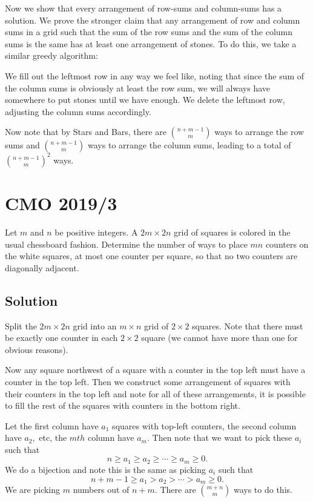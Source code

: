 \documentclass{article}
\begin{document}
Now we show that every arrangement of row-sums and column-sums has a solution. We prove the stronger claim that any arrangement of row and column sums in a grid such that the sum of the row sums and the sum of the column sums is the same has at least one arrangement of stones. To do this, we take a similar greedy algorithm:

\begin{itemize}
\Item We fill out the leftmost row in any way we feel like, noting that since the sum of the column sums is obviously at least the row sum, we will always have somewhere to put stones until we have enough.
\Item We delete the leftmost row, adjusting the column sums accordingly.
\end{itemize}

Now note that by Stars and Bars, there are $\binom{n+m-1}{m}$ ways to arrange the row sums and $\binom{n+m-1}{m}$ ways to arrange the column sums, leading to a total of $\binom{n+m-1}{m}^2$ ways.

\pagebreak\section{CMO 2019/3}

Let $m$ and $n$ be positive integers. A $2m\times 2n$ grid of squares is colored in the usual chessboard fashion. Determine the number of ways to place $mn$ counters on the white squares, at most one counter per square, so that no two counters are diagonally adjacent.

\subsection{Solution}

Split the $2m\times 2n$ grid into an $m\times n$ grid of $2\times 2$ squares. Note that there must be exactly one counter in each $2\times 2$ square (we cannot have more than one for obvious reasons).
    
Now any square northwest of a square with a counter in the top left must have a counter in the top left. Then we construct some arrangement of squares with their counters in the top left and note for all of these arrangements, it is possible to fill the rest of the squares with counters in the bottom right.
    
Let the first column have $a_1$ squares with top-left counters, the second column have $a_2,$ etc, the $mth$ column have $a_m.$ Then note that we want to pick these $a_i$ such that
\[n\geq a_1\geq a_2\geq\cdots\geq a_m\geq 0.\]
We do a bijection and note this is the same as picking $a_i$ such that
\[n+m-1\geq a_1>a_2>\cdots>a_m\geq 0.\]
We are picking $m$ numbers out of $n+m.$ There are $\binom{m+n}{m}$ ways to do this.
\end{document}
